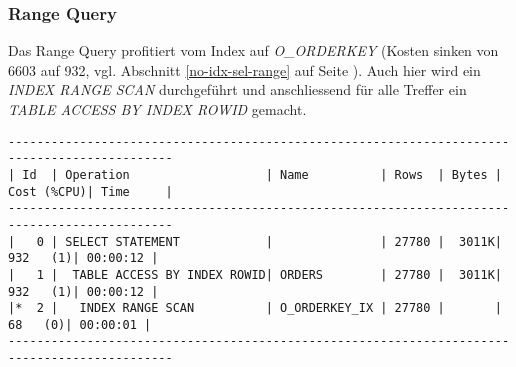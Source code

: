 \documentclass[11pt,a4paper,parskip=half]{scrartcl}
\begin{document}
\subsubsection{Range Query}
\label{idx-sel-range}
Das Range Query profitiert vom  Index auf \emph{O\_ORDERKEY} (Kosten sinken von 6603 auf 932, vgl. Abschnitt \ref{no-idx-sel-range} auf Seite \pageref{no-idx-sel-range}). Auch hier wird ein \emph{INDEX RANGE SCAN} durchgeführt und anschliessend für alle Treffer ein \emph{TABLE ACCESS BY INDEX ROWID} gemacht.
\begin{lstlisting}
---------------------------------------------------------------------------------------------                                                                                                                                                                                                                
| Id  | Operation                   | Name          | Rows  | Bytes | Cost (%CPU)| Time     |                                                                                                                                                                                                                
---------------------------------------------------------------------------------------------                                                                                                                                                                                                                
|   0 | SELECT STATEMENT            |               | 27780 |  3011K|   932   (1)| 00:00:12 |                                                                                                                                                                                                                
|   1 |  TABLE ACCESS BY INDEX ROWID| ORDERS        | 27780 |  3011K|   932   (1)| 00:00:12 |                                                                                                                                                                                                                
|*  2 |   INDEX RANGE SCAN          | O_ORDERKEY_IX | 27780 |       |    68   (0)| 00:00:01 |                                                                                                                                                                                                                
---------------------------------------------------------------------------------------------                                                                                                                                                                                                                
                                                                                                                                                                                                                                                                                                             

\end{lstlisting}
\end{document}

